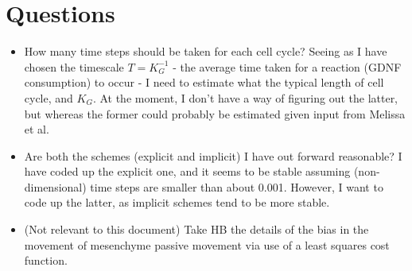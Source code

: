 \documentclass[pdftex,10pt,a4paper]{article}
\begin{document}
\section{Questions}
\begin{itemize}
\item How many time steps should be taken for each cell cycle? Seeing as I have chosen the timescale $T=K^{-1}_G$ - the average time taken for a reaction (GDNF consumption) to occur - I need to estimate what the typical length of cell cycle, and $K_G$. At the moment, I don't have a way of figuring out the latter, but whereas the former could probably be estimated given input from Melissa et al.
\item Are both the schemes (explicit and implicit) I have out forward reasonable? I have coded up the explicit one, and it seems to be stable assuming (non-dimensional) time steps are smaller than about 0.001. However, I want to code up the latter, as implicit schemes tend to be more stable. 
\item (Not relevant to this document) Take HB the details of the bias in the movement of mesenchyme passive movement via use of a least squares cost function.
\end{itemize}
\end{document}
